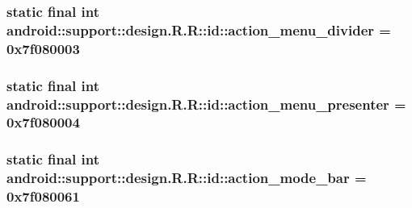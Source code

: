 \hypertarget{classandroid_1_1support_1_1design_1_1_r_1_1id_65acbe62ae81f2747c69472a700d94ac}{
\subsubsection[{action\_\-menu\_\-divider}]{\setlength{\rightskip}{0pt plus 5cm}static final int android::support::design.R.R::id::action\_\-menu\_\-divider = 0x7f080003}}
\label{classandroid_1_1support_1_1design_1_1_r_1_1id_65acbe62ae81f2747c69472a700d94ac}


\hypertarget{classandroid_1_1support_1_1design_1_1_r_1_1id_4aea7b8b9489d7a7dce8718e202025c6}{
\subsubsection[{action\_\-menu\_\-presenter}]{\setlength{\rightskip}{0pt plus 5cm}static final int android::support::design.R.R::id::action\_\-menu\_\-presenter = 0x7f080004}}
\label{classandroid_1_1support_1_1design_1_1_r_1_1id_4aea7b8b9489d7a7dce8718e202025c6}


\hypertarget{classandroid_1_1support_1_1design_1_1_r_1_1id_819a8a76082792d1dd5d114bf9c3dcbb}{
\subsubsection[{action\_\-mode\_\-bar}]{\setlength{\rightskip}{0pt plus 5cm}static final int android::support::design.R.R::id::action\_\-mode\_\-bar = 0x7f080061}}
\label{classandroid_1_1support_1_1design_1_1_r_1_1id_819a8a76082792d1dd5d114bf9c3dcbb}


